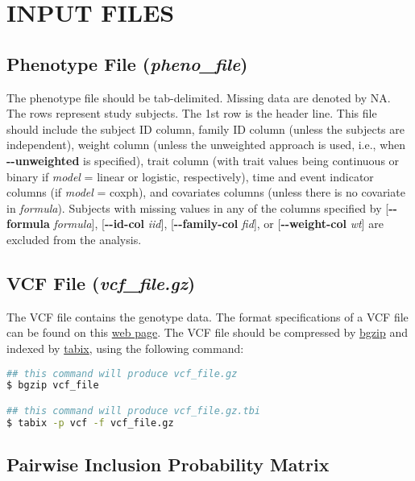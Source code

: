 \documentclass[12pt,letter]{article}
\begin{document}
\section{INPUT FILES}
\subsection{Phenotype File ({\it pheno\_file})}
The phenotype file should be tab-delimited. Missing data are denoted by {\ttfamily NA}. 
The rows represent study subjects. The 1st row is the header line. 
This file should include the subject ID column, family ID column (unless the subjects are independent),
weight column (unless the unweighted approach is used, i.e., when {\bf -{}-unweighted} is specified),
trait column (with trait values being continuous or binary if {\it model} = {\ttfamily linear}
or {\ttfamily logistic}, respectively), time and event indicator columns 
(if {\it model} = {\ttfamily coxph}),
and covariates columns (unless there is no covariate in {\it formula}). 
Subjects with missing values in any of the columns specified by
[{\bf -{}-formula} {\it formula}],
[{\bf -{}-id-col} {\it iid}],
[{\bf -{}-family-col} {\it fid}], or
[{\bf -{}-weight-col} {\it wt}]
are excluded from the analysis.

\subsection{VCF File ({\it vcf\_file.gz})}

The VCF file contains the genotype data. The format specifications of a VCF file can be found
on this \href{http://www.1000genomes.org/wiki/Analysis/Variant\%20Call\%20Format/vcf-variant-call-format-version-41}{web page}.
The VCF file should be compressed by \href{http://www.htslib.org/doc/tabix.html}{bgzip} and 
indexed by \href{http://www.htslib.org/doc/tabix.html}{tabix}, using the following command:
\begin{lstlisting}[language=bash]
## this command will produce vcf_file.gz
$ bgzip vcf_file

## this command will produce vcf_file.gz.tbi     
$ tabix -p vcf -f vcf_file.gz  
\end{lstlisting}

\subsection{Pairwise Inclusion Probability Matrix}
\end{document}
